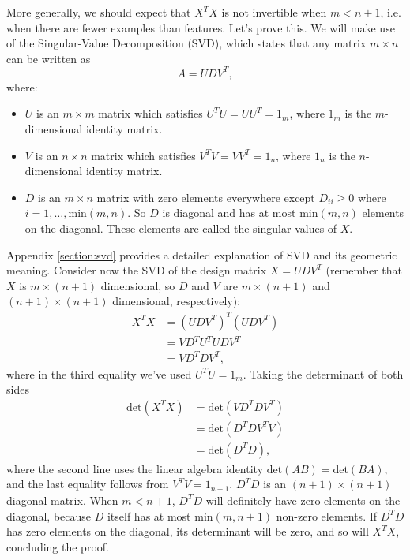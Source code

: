 \documentclass{article}
\theoremstyle{definition}
\begin{document}
More generally, we should expect that $X^TX$ is not invertible when $m<n+1$, i.e. when there are fewer examples than features.
Let's prove this. We will make use of the Singular-Value Decomposition (SVD), which states that any matrix $m\times n$ can be written as
\begin{equation}
    A = UDV^T,
\end{equation}
where:
\begin{itemize}
    \item $U$ is an $m\times m$ matrix which satisfies $U^TU=UU^T=1_m$, where $1_m$ is the $m$-dimensional identity matrix.
    \item $V$ is an $n\times n$ matrix which satisfies $V^TV=VV^T=1_n$, where $1_n$ is the $n$-dimensional identity matrix.
    \item $D$ is an $m\times n$ matrix with zero elements everywhere except $D_{ii}\ge0$ where $i=1,\dots,\text{min}(m, n)$. So $D$ is diagonal and has at most $\text{min}(m, n)$ elements on the diagonal. These elements are called the singular values of $X$.
\end{itemize}
Appendix \ref{section:svd} provides a detailed explanation of SVD and its geometric meaning. Consider now the SVD of the design matrix $X=UDV^T$ (remember that $X$ is $m\times (n+1)$ dimensional, so $D$ and $V$ are $m\times (n+1)$ and $(n+1)\times (n+1)$ dimensional, respectively):
\begin{align*}
    X^TX &= (UDV^T)^T(UDV^T)\\
    &= VD^TU^TUDV^T \\
    &=VD^TDV^T,
\end{align*}
where in the third equality we've used $U^TU=1_m$. Taking the determinant of both sides
\begin{align*}
    \text{det}(X^TX) &= \text{det}(VD^TDV^T)\\
    &= \text{det}(D^TDV^TV) \\
    &= \text{det}(D^TD),
\end{align*}
where the second line uses the linear algebra identity $\text{det}(AB)=\text{det}(BA)$, and the last equality follows from $V^TV=1_{n+1}$. $D^TD$ is an $(n+1)\times(n+1)$ diagonal matrix. When $m<n+1$, $D^TD$ will definitely have zero elements on the diagonal, because $D$ itself has at most $\text{min}(m,n+1)$ non-zero elements. If $D^TD$ has zero elements on the diagonal, its determinant will be zero, and so will $X^TX$, concluding the proof.
\end{document}
